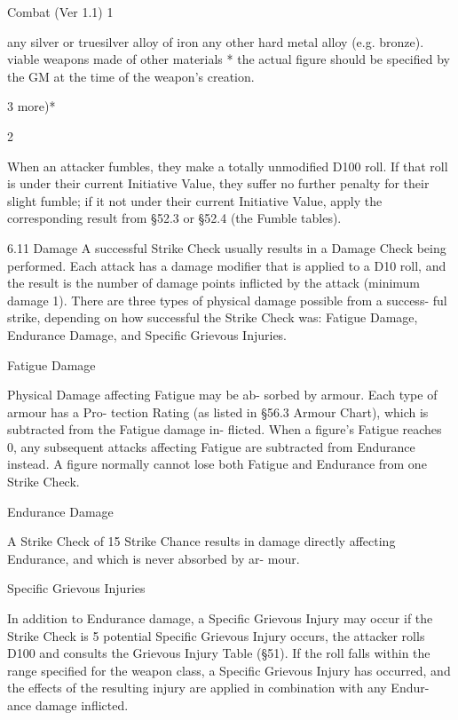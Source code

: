 \begin{Chapter}{Combat (Ver 1.1)}
1%

any silver or truesilver alloy of 
iron 
any other hard metal alloy (e.g. 
bronze). 
viable weapons made of other 
materials 
*  the  actual  figure  should  be  specified  by  the  GM  at  the 
time of the weapon’s creation. 

3%
more)* 

2%

When  an  attacker  fumbles,  they  make  a  totally 
unmodified  D100  roll.  If  that  roll  is  under  their 
current  Initiative  Value,  they  suffer  no  further 
penalty for their slight fumble; if it not under their 
current  Initiative  Value,  apply  the  corresponding 
result from §52.3 or §52.4 (the Fumble tables). 

6.11 Damage 
A  successful  Strike  Check  usually  results  in  a 
Damage Check being performed. Each attack has a 
damage modifier that is applied to a D10 roll, and 
the result is the number of damage points inflicted 
by the attack (minimum damage 1). There are three 
types of physical damage possible from a success-
ful  strike,  depending  on  how  successful  the  Strike 
Check  was:  Fatigue  Damage,  Endurance  Damage, 
and Specific Grievous Injuries. 

Fatigue Damage 

Physical  Damage  affecting  Fatigue  may  be  ab-
sorbed by armour. Each type of armour has a Pro-
tection  Rating  (as  listed  in  §56.3  Armour  Chart), 
which  is  subtracted  from  the  Fatigue  damage  in-
flicted.  When  a  figure’s  Fatigue  reaches  0,  any 
subsequent attacks affecting Fatigue are subtracted 
from Endurance instead. A figure normally cannot 
lose  both  Fatigue  and  Endurance  from  one  Strike 
Check. 

Endurance Damage 

A  Strike  Check  of  15%
Strike  Chance  results  in  damage  directly  affecting 
Endurance,  and  which  is  never  absorbed  by  ar-
mour. 

Specific Grievous Injuries 

In  addition  to  Endurance  damage,  a  Specific 
Grievous  Injury  may  occur  if  the  Strike  Check  is 
5%
potential  Specific  Grievous  Injury  occurs,  the 
attacker  rolls  D100  and  consults  the  Grievous 
Injury Table (§51). If the roll falls within the range 
specified for the weapon class, a Specific Grievous 
Injury has occurred, and the effects of the resulting 
injury are applied in combination with any Endur-
ance damage inflicted. 


\end{Chapter}
